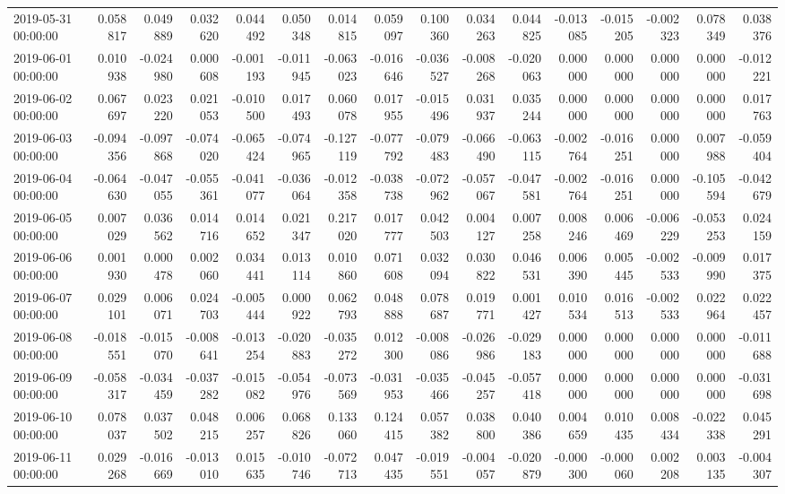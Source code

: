 \begin{tabular}{lrrrrrrrrrrrrrrr}
2019-05-31 00:00:00 & 0.058817 & 0.049889 & 0.032620 & 0.044492 & 0.050348 & 0.014815 & 0.059097 & 0.100360 & 0.034263 & 0.044825 & -0.013085 & -0.015205 & -0.002323 & 0.078349 & 0.038376 \\
2019-06-01 00:00:00 & 0.010938 & -0.024980 & 0.000608 & -0.001193 & -0.011945 & -0.063023 & -0.016646 & -0.036527 & -0.008268 & -0.020063 & 0.000000 & 0.000000 & 0.000000 & 0.000000 & -0.012221 \\
2019-06-02 00:00:00 & 0.067697 & 0.023220 & 0.021053 & -0.010500 & 0.017493 & 0.060078 & 0.017955 & -0.015496 & 0.031937 & 0.035244 & 0.000000 & 0.000000 & 0.000000 & 0.000000 & 0.017763 \\
2019-06-03 00:00:00 & -0.094356 & -0.097868 & -0.074020 & -0.065424 & -0.074965 & -0.127119 & -0.077792 & -0.079483 & -0.066490 & -0.063115 & -0.002764 & -0.016251 & 0.000000 & 0.007988 & -0.059404 \\
2019-06-04 00:00:00 & -0.064630 & -0.047055 & -0.055361 & -0.041077 & -0.036064 & -0.012358 & -0.038738 & -0.072962 & -0.057067 & -0.047581 & -0.002764 & -0.016251 & 0.000000 & -0.105594 & -0.042679 \\
2019-06-05 00:00:00 & 0.007029 & 0.036562 & 0.014716 & 0.014652 & 0.021347 & 0.217020 & 0.017777 & 0.042503 & 0.004127 & 0.007258 & 0.008246 & 0.006469 & -0.006229 & -0.053253 & 0.024159 \\
2019-06-06 00:00:00 & 0.001930 & 0.000478 & 0.002060 & 0.034441 & 0.013114 & 0.010860 & 0.071608 & 0.032094 & 0.030822 & 0.046531 & 0.006390 & 0.005445 & -0.002533 & -0.009990 & 0.017375 \\
2019-06-07 00:00:00 & 0.029101 & 0.006071 & 0.024703 & -0.005444 & 0.000922 & 0.062793 & 0.048888 & 0.078687 & 0.019771 & 0.001427 & 0.010534 & 0.016513 & -0.002533 & 0.022964 & 0.022457 \\
2019-06-08 00:00:00 & -0.018551 & -0.015070 & -0.008641 & -0.013254 & -0.020883 & -0.035272 & 0.012300 & -0.008086 & -0.026986 & -0.029183 & 0.000000 & 0.000000 & 0.000000 & 0.000000 & -0.011688 \\
2019-06-09 00:00:00 & -0.058317 & -0.034459 & -0.037282 & -0.015082 & -0.054976 & -0.073569 & -0.031953 & -0.035466 & -0.045257 & -0.057418 & 0.000000 & 0.000000 & 0.000000 & 0.000000 & -0.031698 \\
2019-06-10 00:00:00 & 0.078037 & 0.037502 & 0.048215 & 0.006257 & 0.068826 & 0.133060 & 0.124415 & 0.057382 & 0.038800 & 0.040386 & 0.004659 & 0.010435 & 0.008434 & -0.022338 & 0.045291 \\
2019-06-11 00:00:00 & 0.029268 & -0.016669 & -0.013010 & 0.015635 & -0.010746 & -0.072713 & 0.047435 & -0.019551 & -0.004057 & -0.020879 & -0.000300 & -0.000060 & 0.002208 & 0.003135 & -0.004307 \\

\end{tabular}
